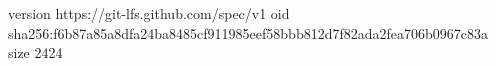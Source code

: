 version https://git-lfs.github.com/spec/v1
oid sha256:f6b87a85a8dfa24ba8485cf911985eef58bbb812d7f82ada2fea706b0967c83a
size 2424

